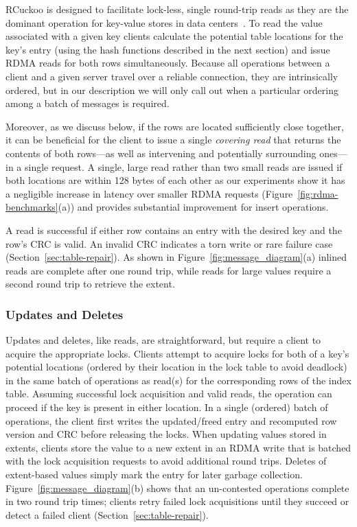 RCuckoo is designed to facilitate lock-less, single round-trip reads as
they are the dominant operation for key-value stores in data
centers~\cite{facebook-memcached}. To read the value associated with a
given key clients calculate the potential table locations for the
key's entry (using the hash functions described in the next section)
and issue RDMA reads for both rows simultaneously.  Because all
operations between a client and a given server travel over a reliable
connection, they are intrinsically ordered, but in our description we
will only call out when a particular ordering among a batch of
messages is required.

Moreover, as we discuss below, if the rows are
located sufficiently close together, it can be beneficial for the
client to issue a single \emph{covering read} that returns the
contents of both rows---as well as intervening and potentially
surrounding ones---in a single request.
A single, large read rather than two small reads are issued
if both locations are within
128 bytes of each other as our experiments show it has a negligible
increase in latency over smaller RDMA requests
(Figure~\ref{fig:rdma-benchmarks}(a)) and provides substantial
improvement for insert operations.

A read is successful if
either row contains an entry with the desired key and the row's CRC is
valid. An invalid CRC indicates a torn write or rare
failure case (Section~\ref{sec:table-repair}).  As shown in
Figure~\ref{fig:message_diagram}(a) inlined reads are complete after
one round trip, while reads for large values require a second round
trip to retrieve the extent.


\subsubsection{Updates and Deletes}

Updates and deletes, like reads, are straightforward, but require a
client to acquire the appropriate locks.  Clients attempt to acquire
locks for both of a key's potential locations (ordered by their
location in the lock table to avoid deadlock) in the same batch of
operations as read(s) for the corresponding rows of the index table.
Assuming successful lock acquisition and valid reads, the operation
can proceed if the key is present in either location.  In a single
(ordered) batch of operations, the client first writes the
updated/freed entry and recomputed row version and CRC before
releasing the locks. When updating values stored in extents, clients
store the value to a new extent in an RDMA write that is batched with
the lock acquisition requests to avoid additional round trips.
Deletes of extent-based values simply mark the entry for later garbage
collection.  Figure~\ref{fig:message_diagram}(b) shows that an
un-contested operations complete in two round trip times; clients
retry failed lock acquisitions until they succeed or detect a failed
client (Section~\ref{sec:table-repair}).

